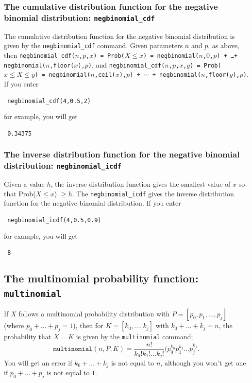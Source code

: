 \documentclass[a4paper,11pt]{book}
\begin{document}
\subsubsection{The cumulative distribution function for the negative
binomial distribution: \texttt{negbinomial\_cdf}}

The cumulative distribution function for the negative binomial
distribution is given by the \texttt{negbinomial\_cdf} command.  Given
parameters $n$ and $p$, as above, then
\texttt{negbinomial\_cdf($n$,$p$,$x$) = Prob($X \le x$) =
negbinomial($n$,$0$,$p$) + \ldots + negbinomial($n$,floor($x$),$p$)},
and
\texttt{negbinomial\_cdf($n$,$p$,$x$,$y$) = Prob($x \le X \le y$) = 
negbinomial($n$,ceil($x$),$p$) + $\cdots$ + negbinomial($n$,floor($y$),$p$)}.
If you enter
\begin{center}
  \tt
  negbinomial\_cdf(4,0.5,2)
\end{center}
for example, you will get
\begin{center}
  \tt
  0.34375  
\end{center}

\subsubsection{The inverse distribution function for the negative
binomial distribution: \texttt{negbinomial\_icdf}}

Given a value $h$, the inverse distribution function gives
the smallest value
of $x$ so that Prob($X \le x$) $\ge h$.
The \texttt{negbinomial\_icdf} gives the inverse
distribution function for the negative binomial distribution.  
If you enter
\begin{center}
  \tt
  negbinomial\_icdf(4,0.5,0.9)
\end{center}
for example, you will get
\begin{center}
  \tt
  8
\end{center}

\subsection{The multinomial probability function: \texttt{multinomial}}

If $X$ follows a multinomial probability distribution with
$P = [p_0,p_1,\dots,p_j]$ (where $p_0 + \dots + p_j = 1$),
then for $K=[k_0,\dots,k_j]$ with $k_0 + \dots + k_j = n$, the
probability that $X=K$ is given by the \texttt{multinomial} command; 
\[\texttt{multinomial}(n,P,K)= \frac{n!}{k_0!k_1!\dots
k_j!}(p_0^{k_0}p_1^{k_1}\dots p_j^{k_j}.\]
You will get an error if $k_0 + \dots + k_j$ is not equal to $n$,
although you won't get one if $p_0 + \dots + p_j$ is not equal to $1$.
\end{document}

